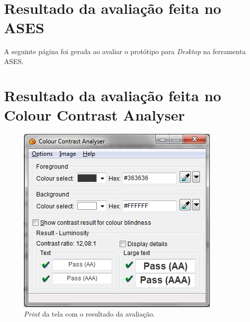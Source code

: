 \begin{anexosenv}
    \chapter{Resultado da avaliação feita no ASES}
    
    A seguinte página foi gerada ao avaliar o protótipo para \textit{Desktop} na ferramenta ASES. 
        
    
    
    \chapter{Resultado da avaliação feita no Colour Contrast Analyser}
       
    \begin{figure}[!htbp]
      \centering
      \includegraphics[scale=1, angle=0]{editaveis/figuras/cca}
      \caption{\textit{Print} da tela com o resultado da avaliação.}
    \end{figure}
    \pagebreak
    
\end{anexosenv}

